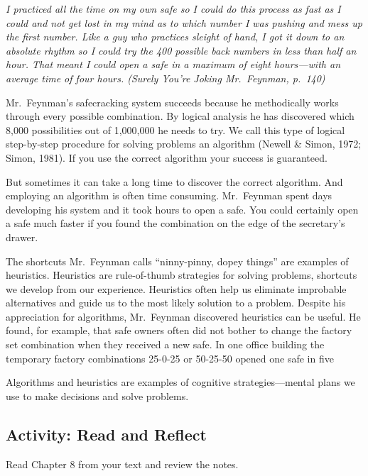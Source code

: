 \documentclass[
]{book}
\begin{document}
\emph{I practiced all the time on my own safe so I could do this process as fast as I could and not get lost in my mind as to which number I was pushing and mess up the first number. Like a guy who practices sleight of hand, I got it down to an absolute rhythm so I could try the 400 possible back numbers in less than half an hour. That meant I could open a safe in a maximum of eight hours---with an average time of four hours. (Surely You're Joking Mr.~Feynman, p.~140)}

Mr.~Feynman's safecracking system succeeds because he methodically works through every possible combination. By logical analysis he has discovered which 8,000 possibilities out of 1,000,000 he needs to try. We call this type of logical step-by-step procedure for solving problems an algorithm (Newell \& Simon, 1972; Simon, 1981). If you use the correct algorithm your success is guaranteed.

But sometimes it can take a long time to discover the correct algorithm. And employing an algorithm is often time consuming. Mr.~Feynman spent days developing his system and it took hours to open a safe. You could certainly open a safe much faster if you found the combination on the edge of the secretary's drawer.

The shortcuts Mr.~Feynman calls ``ninny-pinny, dopey things'' are examples of heuristics. Heuristics are rule-of-thumb strategies for solving problems, shortcuts we develop from our experience. Heuristics often help us eliminate improbable alternatives and guide us to the most likely solution to a problem. Despite his appreciation for algorithms, Mr.~Feynman discovered heuristics can be useful. He found, for example, that safe owners often did not bother to change the factory set combination when they received a new safe. In one office building the temporary factory combinations 25-0-25 or 50-25-50 opened one safe in five

Algorithms and heuristics are examples of cognitive strategies---mental plans we use to make decisions and solve problems.

\hypertarget{activity-read-and-reflect}{%
\subsection*{Activity: Read and Reflect}\label{activity-read-and-reflect}}

\begin{reflect}
Read Chapter 8 from your text and review the notes.
\end{reflect}
\end{document}

